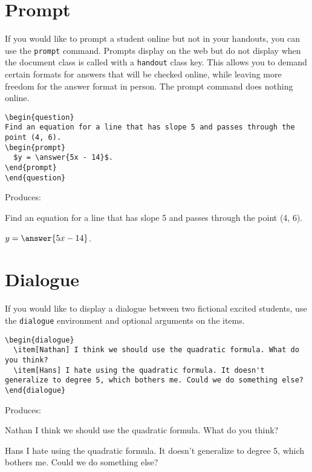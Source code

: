 \documentclass{ximera}
\begin{document}
\section{Prompt} \label{Prompts}

\begin{example} If you would like to prompt a student online but not in your handouts, you can use the \verb!prompt! command. Prompts display on the web but do not display when the document class is called with a \verb!handout! class key. This allows you to demand certain formats for answers that will be checked online, while leaving more freedom for the answer format in person. The prompt command does nothing online.

\begin{verbatim}
\begin{question}
Find an equation for a line that has slope 5 and passes through the point (4, 6). 
\begin{prompt} 
  $y = \answer{5x - 14}$.
\end{prompt} 
\end{question}
\end{verbatim}

Produces:

\begin{question}
Find an equation for a line that has slope 5 and passes through the point (4, 6). 
\begin{prompt} 
  $y = \answer{5x - 14}$.
\end{prompt} 
\end{question}

\end{example}

\section{Dialogue} \label{Dialogue}

\begin{example} If you would like to display a dialogue between two fictional excited students, use the \verb!dialogue! environment and optional arguments on the items. 

\begin{verbatim}
\begin{dialogue}
  \item[Nathan] I think we should use the quadratic formula. What do you think?
  \item[Hans] I hate using the quadratic formula. It doesn't generalize to degree 5, which bothers me. Could we do something else?
\end{dialogue}
\end{verbatim}

Produces:

\begin{dialogue}
  \item[Nathan] I think we should use the quadratic formula. What do you think?
  \item[Hans] I hate using the quadratic formula. It doesn't generalize to degree 5, which bothers me. Could we do something else?
\end{dialogue}
\end{example}
\end{document}
